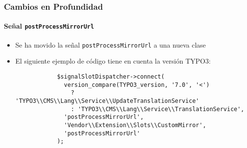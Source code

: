 \begin{frame}[fragile]
	\frametitle{Cambios en Profundidad}
	\framesubtitle{Señal \texttt{postProcessMirrorUrl}}

	\lstset{basicstyle=\tiny\ttfamily}

	\begin{itemize}

		\item Se ha movido la señal \texttt{postProcessMirrorUrl} a una nueva clase

		\breakingchange

		\item El siguiente ejemplo de código tiene en cuenta la versión TYPO3:

		\begin{lstlisting}
			$signalSlotDispatcher->connect(
			  version_compare(TYPO3_version, '7.0', '<')
			    ? 'TYPO3\\CMS\\Lang\\Service\\UpdateTranslationService'
			    : 'TYPO3\\CMS\\Lang\\Service\\TranslationService',
			  'postProcessMirrorUrl',
			  'Vendor\\Extension\\Slots\\CustomMirror',
			  'postProcessMirrorUrl'
			);
		\end{lstlisting}

	\end{itemize}

\end{frame}

